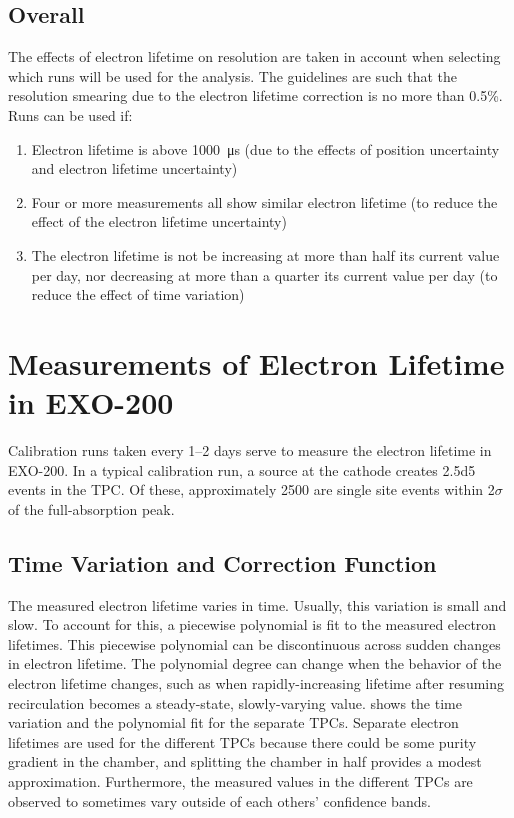\documentclass[herrin-thesis.tex]{subfiles}
\begin{document}
\subsection{Overall}
The effects of electron lifetime on resolution are taken in account when selecting which runs will be used for the analysis. The guidelines are such that the resolution smearing due to the electron lifetime correction is no more than 0.5\%. Runs can be used if:
\begin{enumerate}
\item Electron lifetime is above \SI{1000}{\micro\second} (due to the effects of position uncertainty and electron lifetime uncertainty)
\item Four or more measurements all show similar electron lifetime (to reduce the effect of the electron lifetime uncertainty)
\item The electron lifetime is not be increasing at more than half its current value per day, nor decreasing at more than a quarter its current value per day (to reduce the effect of time variation)
\end{enumerate}

\section{Measurements of Electron Lifetime in EXO-200}

Calibration runs taken every 1--2 days serve to measure the electron lifetime in EXO-200. In a typical calibration run, a  source at the cathode creates \num{2.5d5} events in the TPC. Of these, approximately 2500 are single site events within 2\(\sigma\) of the full-absorption peak.

\subsection{Time Variation and Correction Function}

The measured electron lifetime varies in time. Usually, this variation is small and slow. To account for this, a piecewise polynomial is fit to the measured electron lifetimes. This piecewise polynomial can be discontinuous across sudden changes in electron lifetime. The polynomial degree can change when the behavior of the electron lifetime changes, such as when rapidly-increasing lifetime after resuming recirculation becomes a steady-state, slowly-varying value.  shows the time variation and the polynomial fit for the separate TPCs. Separate electron lifetimes are used for the different TPCs because there could be some purity gradient in the chamber, and splitting the chamber in half provides a modest approximation. Furthermore, the measured values in the different TPCs are observed to sometimes vary outside of each others' confidence bands.
\end{document}
